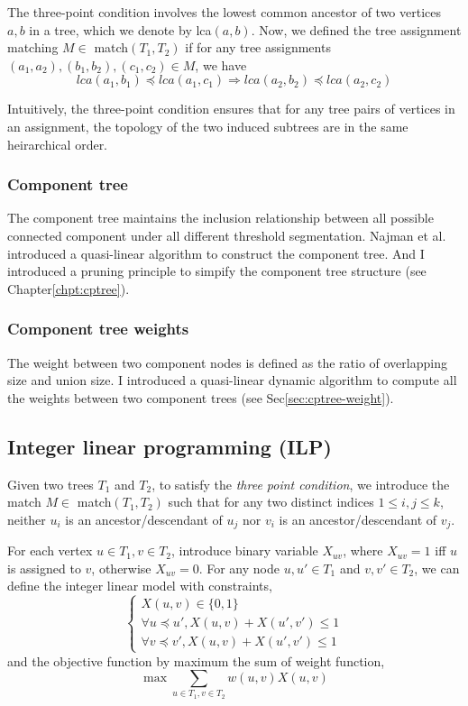 The three-point condition involves the lowest common ancestor of two vertices $a,b$ in a tree, which we denote by lca$(a,b)$. Now, we defined the tree assignment matching $M \in$ match$(T_1,T_2)$ if for any tree assignments $(a_1,a_2),(b_1,b_2),(c_1,c_2) \in M$, we have
$$
lca(a_1,b_1) \preceq lca(a_1,c_1)  \Rightarrow lca(a_2,b_2) \preceq lca(a_2,c_2)
$$

Intuitively, the three-point condition ensures that for any tree pairs of vertices in an assignment, the topology of the two induced subtrees are in the same heirarchical order.  
\subsubsection{Component tree}
The component tree maintains the inclusion relationship between all possible connected component under all different threshold segmentation. Najman et al.\cite{Najman:04} introduced a quasi-linear algorithm to construct the component tree. And I introduced a pruning principle to simpify the component tree structure (see Chapter\ref{chpt:cptree}).

\subsubsection{Component tree weights}
The weight between two component nodes is defined as the ratio of overlapping size and union size. I introduced a quasi-linear dynamic algorithm to compute all the weights between two component trees (see Sec\ref{sec:cptree-weight}).
\subsection{Integer linear programming (ILP)}
Given two trees $T_1$ and $T_2$, to satisfy the \emph{three point condition}, we introduce the match $M \in$ match$(T_1,T_2)$ such that for any two distinct indices $1 \le i,j \le k$, neither $u_i$ is an ancestor/descendant of $u_j$ nor $v_i$ is an ancestor/descendant of $v_j$. 

For each vertex $u \in T_1, v \in T_2$, introduce binary variable $X_{uv}$, where $X_{uv} = 1$ iff $u$ is assigned to $v$, otherwise $X_{uv} = 0$. For any node $u, u' \in T_1$ and $v, v' \in T_2$, we can define the integer linear model with constraints,
\begin{equation}
\label{eqn:cptree-ilp-st}
\left\{
\begin{array}{l}
X(u,v) \in \{0,1\} \\
\forall u \preceq u', X(u,v) + X(u',v') \le 1 \\
\forall v \preceq v', X(u,v) + X(u',v') \le 1 
\end{array}
\right.
\end{equation}
and the objective function by maximum the sum of weight function,
\begin{equation}
 \max \sum_{u\in T_1, v \in T_2} w(u,v)X(u,v)
\end{equation}

